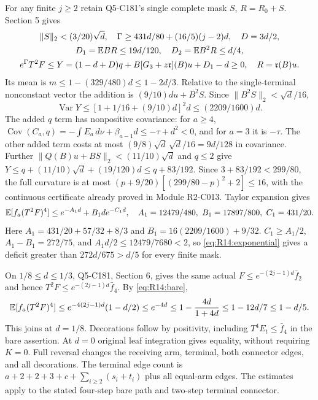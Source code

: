 For any finite $j\ge2$ retain Q5-C181's single complete mask $S$,
$R=R_0+S$. Section 5 gives
\[
\begin{gathered}
\|S\|_2<(3/20)\sqrt d,\quad
\Gamma\ge431d/80+(16/5)(j-2)d,\quad D=3d/2,\\
D_1=\mathbb E BR\le19d/120,\quad D_2=\mathbb E B^2R\le d/4,\\
e^\Gamma T^2F\le
Y=(1-d+D)q+B[G_3+z\mathfrak r](B)u+D_1-d\ge0,\quad
R=\mathfrak r(B)u.
\end{gathered}
\]
Its mean is $m\le1-(329/480)d\le1-2d/3$.
Relative to the single-terminal nonconstant vector the addition is
$(9/10)du+B^2S$. Since $\|B^2S\|_2<\sqrt d/16$,
\[
\operatorname{Var}Y\le[1+1/16+(9/10)d]^2d\le(2209/1600)d.
\]
The added $q$ term has nonpositive covariance: for $a\ge4$,
$\operatorname{Cov}(C_a,\allowbreak q)=-\int E_a\,\allowbreak d\nu+\beta_{a-1}d
\le-\tau+d^2<0$, and for $a=3$ it is $-\tau$.
The other added term costs at most
$(9/8)\sqrt d\,\sqrt d/16=9d/128$ in covariance.
Further $\|Q(B)u+BS\|_2<(11/10)\sqrt d$ and $q\le2$ give
$Y\le q+(11/10)\sqrt d+(19/120)d\le q+83/192$.
Since $3+83/192<299/80$, the full curvature is at most
$(p+9/20)[(299/80-p)^2+2]\le16$, with the continuous certificate
already proved in Module R2-C013.
Taylor expansion gives
\[
\mathbb E[f_a(T^2F)^4]\le e^{-A_1d}+B_1de^{-C_1d},\quad
A_1=12479/480,\ B_1=17897/800,\ C_1=431/20.
\]
Here $A_1=431/20+57/32+8/3$ and
$B_1=16(2209/1600)+9/32$.
$C_1\ge A_1/2$, $A_1-B_1=272/75$, and
$A_1d/2\le12479/7680<2$, so \eqref{eq:R14:exponential} gives
a deficit greater than $272d/675>d/5$ for every finite mask.

On $1/8\le d\le1/3$, Q5-C181, Section 6, gives the same actual
$F\le e^{-(2j-1)d}\bar f_2$ and hence
$T^2F\le e^{-(2j-1)d}\bar f_4$.
By \eqref{eq:R14:bare},
\[
\mathbb E[f_a(T^2F)^4]\le e^{-4(2j-1)d}(1-d/2)
\le e^{-4d}\le1-\frac{4d}{1+4d}\le1-12d/7\le1-d/5.
\]
This joins at $d=1/8$. Decorations follow by positivity, including
$T^4E_t\le\bar f_4$ in the bare assertion. At $d=0$ original leaf
integration gives equality, without requiring $K=0$. Full reversal
changes the receiving arm, terminal, both connector edges, and all
decorations. The terminal edge count is
$a+2+2+3+c+\sum_{i\ge2}(s_i+t_i)$ plus all equal-arm edges.
The estimates apply to the stated four-step bare path and two-step terminal connector.
